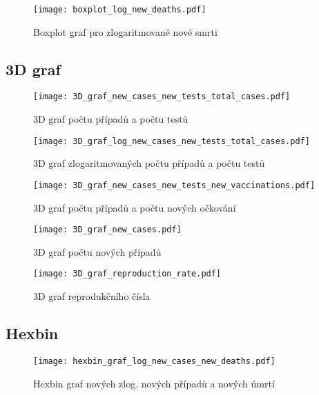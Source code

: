 \documentclass[a4paper, 12pt]{article}
\begin{document}
\begin{figure}[H]
\centering

\texttt{[image: boxplot\_log\_new\_deaths.pdf]}
\caption{Boxplot graf pro zlogaritmované nové smrti}
\end{figure}

\subsection{3D graf}
\begin{figure}[H]
\centering

\texttt{[image: 3D\_graf\_new\_cases\_new\_tests\_total\_cases.pdf]}
\caption{3D graf počtu případů a počtu testů}

\texttt{[image: 3D\_graf\_log\_new\_cases\_new\_tests\_total\_cases.pdf]}
\caption{3D graf zlogaritmovaných počtu případů a počtu testů}

\end{figure}
\begin{figure}[H]

\texttt{[image: 3D\_graf\_new\_cases\_new\_tests\_new\_vaccinations.pdf]}
\caption{3D graf počtu případů a počtu nových očkování}

\texttt{[image: 3D\_graf\_new\_cases.pdf]}
\caption{3D graf počtu nových případů}

\end{figure}
\begin{figure}[H]

\texttt{[image: 3D\_graf\_reproduction\_rate.pdf]}
\caption{3D graf reprodukčního čísla}

\end{figure}

\subsection{Hexbin}
\begin{figure}[H]
\centering

\texttt{[image: hexbin\_graf\_log\_new\_cases\_new\_deaths.pdf]}
\caption{Hexbin graf nových zlog. nových případů a nových úmrtí}

\end{figure}
\clearpage
\end{document}
